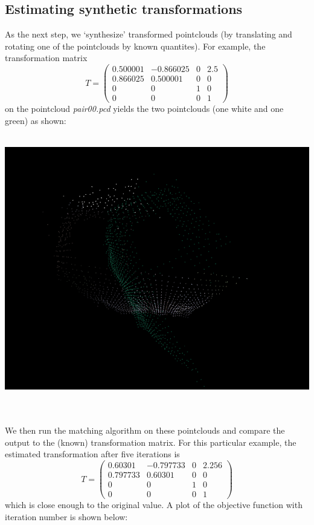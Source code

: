 \documentclass[11pt, a4paper]{article}
\begin{document}
\subsection{Estimating synthetic transformations} 
As the next step, we `synthesize' transformed pointclouds (by translating and rotating one of the pointclouds by known quantites). For example, the transformation matrix
$$T = \begin{pmatrix}
 0.500001 & -0.866025 & 0 & 2.5 \\
 0.866025 & 0.500001 & 0 & 0 \\
        0 & 0 & 1 & 0 \\
        0 & 0 & 0 & 1
\end{pmatrix}$$
on the pointcloud \textit{pair00.pcd} yields the two pointclouds (one white and one green) as shown: \\ \\
\centerline{\includegraphics[scale=0.5]{synthPair}} \\ \\
We then run the matching algorithm on these pointclouds and compare the output to the (known) transformation matrix. For this particular example, the estimated transformation after five iterations is
$$T = \begin{pmatrix}
 0.60301 & -0.797733 & 0 & 2.256 \\
 0.797733 & 0.60301 & 0 & 0 \\
        0 & 0 & 1 & 0 \\
        0 & 0 & 0 & 1
\end{pmatrix}$$
which is close enough to the original value. A plot of the objective function with iteration number is shown below: \\ \\
\end{document}
